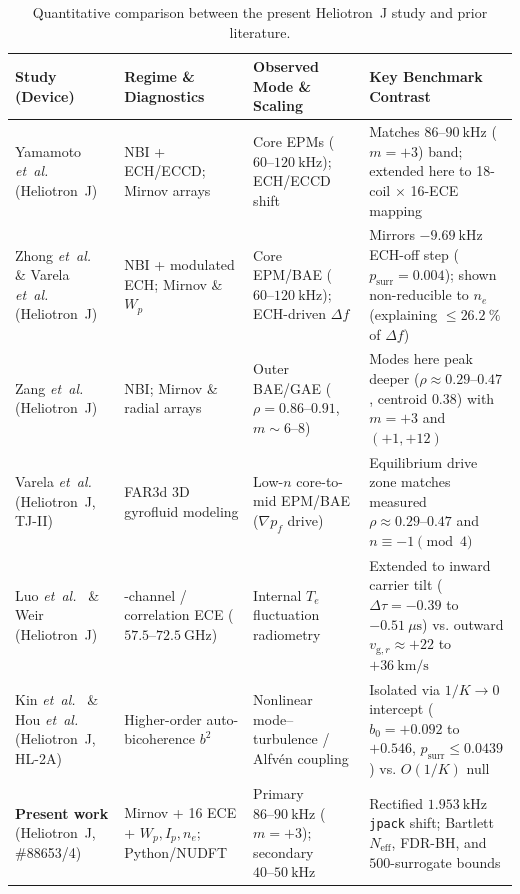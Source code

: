 \begin{table}[H]
  \centering
  \caption[Quantitative comparison between the present Heliotron~J study and prior literature]{Quantitative comparison between the present Heliotron~J study and prior literature.}
  \label{tab:literature_contrast}
  \footnotesize
  \setlength{\tabcolsep}{4pt}
  \renewcommand{\arraystretch}{1.18}
  \begin{tabular}{>{\raggedright\arraybackslash}p{}>{\raggedright\arraybackslash}p{}>{\raggedright\arraybackslash}p{}>{\raggedright\arraybackslash}p{}}
    \toprule
    \textbf{Study (Device)} & \textbf{Regime \& Diagnostics} & \textbf{Observed Mode \& Scaling} & \textbf{Key Benchmark Contrast} \\
    \midrule
    Yamamoto \emph{et~al.}~\cite{Yamamoto_2020} (Heliotron~J) & NBI + ECH/ECCD; Mirnov arrays & Core EPMs ($60\text{--}120~\mathrm{kHz}$); ECH/ECCD shift & Matches $86\text{--}90~\mathrm{kHz}$ ($m=+3$) band; extended here to 18-coil $\times$ 16-ECE mapping \\
    Zhong \emph{et~al.}~\cite{Zhong2024} \& Varela \emph{et~al.}~\cite{Varela2023} (Heliotron~J) & NBI + modulated ECH; Mirnov \& $W_p$ & Core EPM/BAE ($60\text{--}120~\mathrm{kHz}$); ECH-driven $\Delta f$ & Mirrors $-9.69~\mathrm{kHz}$ ECH-off step ($p_{\mathrm{surr}} = 0.004$); shown non-reducible to $n_e$ (explaining $\le 26.2~\%$ of $\Delta f$) \\
    Zang \emph{et~al.}~\cite{zang2019observation} (Heliotron~J) & NBI; Mirnov \& radial arrays & Outer BAE/GAE ($\rho = 0.86\text{--}0.91$, $m \sim 6\text{--}8$) & Modes here peak deeper ($\rho \approx 0.29\text{--}0.47$, centroid $0.38$) with $m=+3$ and $(+1, +12)$ \\
    Varela \emph{et~al.}~\cite{Varela2015,Varela2024} (Heliotron~J, TJ-II) & FAR3d 3D gyrofluid modeling & Low-$n$ core-to-mid EPM/BAE ($\nabla p_f$ drive) & Equilibrium drive zone matches measured $\rho \approx 0.29\text{--}0.47$ and $n \equiv -1 \pmod 4$ \\
    Luo \emph{et~al.}~\cite{luo2020measurement} \& Weir~\cite{Weir2019} (Heliotron~J) & 16-channel / correlation ECE ($57.5\text{--}72.5~\mathrm{GHz}$) & Internal $T_e$ fluctuation radiometry & Extended to inward carrier tilt ($\Delta\tau = -0.39$ to $-0.51~\mu\mathrm{s}$) vs. outward $v_{\mathrm{g},r} \approx +22$ to $+36~\mathrm{km/s}$ \\
    Kin \emph{et~al.}~\cite{Kin2025} \& Hou \emph{et~al.}~\cite{Hou2019} (Heliotron~J, HL-2A) & Higher-order auto-bicoherence $b^2$ & Nonlinear mode--turbulence / Alfv\'en coupling & Isolated via $1/K \to 0$ intercept ($b_0 = +0.092$ to $+0.546$, $p_{\mathrm{surr}} \le 0.0439$) vs. $O(1/K)$ null \\
    \textbf{Present work} (Heliotron~J, \#88653/4) & 18 Mirnov + 16 ECE + $W_p, I_p, n_e$; Python/NUDFT & Primary $86\text{--}90~\mathrm{kHz}$ ($m=+3$); secondary $40\text{--}50~\mathrm{kHz}$ & Rectified $1.953~\mathrm{kHz}$ \texttt{jpack} shift; Bartlett $N_{\mathrm{eff}}$, FDR-BH, and $500$-surrogate bounds \\
    \bottomrule
  \end{tabular}
\end{table}

